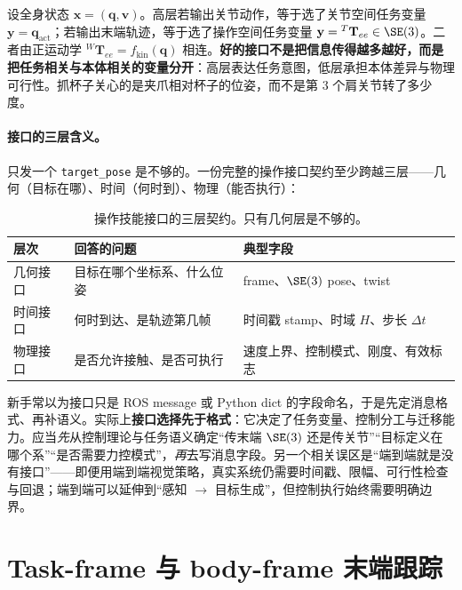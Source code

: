 \begin{insight}[接口的本质是任务变量的选择]
设全身状态 $\mathbf x=(\mathbf q,\mathbf v)$。高层若输出关节动作，等于选了关节空间任务变量 $\mathbf y=\mathbf q_{\mathrm{act}}$；若输出末端轨迹，等于选了操作空间任务变量 $\mathbf y={}^{T}\mathbf{T}_{ee}\in\SE(3)$。二者由正运动学 ${}^{W}\mathbf{T}_{ee}=f_{\mathrm{kin}}(\mathbf q)$ 相连。\textbf{好的接口不是把信息传得越多越好，而是把任务相关与本体相关的变量分开}：高层表达任务意图，低层承担本体差异与物理可行性。抓杯子关心的是夹爪相对杯子的位姿，而不是第 $3$ 个肩关节转了多少度。
\end{insight}

\paragraph{接口的三层含义。}
只发一个 \verb|target_pose| 是不够的。一份完整的操作接口契约至少跨越三层——几何（目标在哪）、时间（何时到）、物理（能否执行）：

\begin{table}[H]\centering\small
\caption{操作技能接口的三层契约。只有几何层是不够的。}
\label{tab:si-contract}
\begin{tabular}{lll}
\toprule
层次 & 回答的问题 & 典型字段 \\
\midrule
几何接口 & 目标在哪个坐标系、什么位姿 & frame、$\SE(3)$ pose、twist \\
时间接口 & 何时到达、是轨迹第几帧 & 时间戳 stamp、时域 $H$、步长 $\Delta t$ \\
物理接口 & 是否允许接触、是否可执行 & 速度上界、控制模式、刚度、有效标志 \\
\bottomrule
\end{tabular}
\end{table}

\begin{pitfall}
新手常以为接口只是 ROS message 或 Python dict 的字段命名，于是先定消息格式、再补语义。实际上\textbf{接口选择先于格式}：它决定了任务变量、控制分工与迁移能力。应当\emph{先}从控制理论与任务语义确定“传末端 $\SE(3)$ 还是传关节”“目标定义在哪个系”“是否需要力控模式”，\emph{再}去写消息字段。另一个相关误区是“端到端就是没有接口”——即便用端到端视觉策略，真实系统仍需要时间戳、限幅、可行性检查与回退；端到端可以延伸到“感知 $\to$ 目标生成”，但控制执行始终需要明确边界。
\end{pitfall}

\section{Task-frame 与 body-frame 末端跟踪}
\label{sec:si-taskframe}

